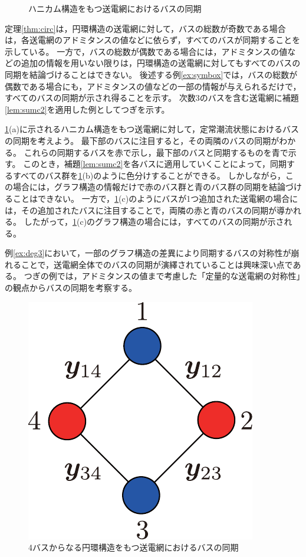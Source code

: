 \documentclass[tombow,dvipdfmx]{corona-a5}
\begin{document}
\begin{figure}[t]
{\begin{minipage}{0.3\linewidth}
    \subcaption{  }
  \end{minipage}
  \caption{ハニカム構造をもつ送電網におけるバスの同期}
  \label{fig:hony}
  }
\end{figure}

定理\ref{thm:circ}は，円環構造の送電網に対して，バスの総数が奇数である場合は，各送電網のアドミタンスの値などに依らず，すべてのバスが同期することを示している。
一方で，バスの総数が偶数である場合には，アドミタンスの値などの追加の情報を用いない限りは，円環構造の送電網に対してもすべてのバスの同期を結論づけることはできない。
後述する例\ref{ex:symbox}では，バスの総数が偶数である場合にも，アドミタンスの値などの一部の情報が与えられるだけで，すべてのバスの同期が示され得ることを示す。
次数3のバスを含む送電網に補題\ref{lem:sumc2}を適用した例としてつぎを示す。

\begin{例}[ハニカム構造の送電網におけるバスの同期]\label{ex:deg3}
\ref{fig:hony}(a)に示されるハニカム構造をもつ送電網に対して，定常潮流状態におけるバスの同期を考えよう。
最下部のバスに注目すると，その両隣のバスの同期がわかる。
これらの同期するバスを赤で示し，最下部のバスと同期するものを青で示す。
このとき，補題\ref{lem:sumc2}を各バスに適用していくことによって，同期するすべてのバス群を\ref{fig:hony}(b)のように色分けすることができる。
しかしながら，この場合には，グラフ構造の情報だけで赤のバス群と青のバス群の同期を結論づけることはできない。
一方で，\ref{fig:hony}(c)のようにバスが1つ追加された送電網の場合には，その追加されたバスに注目することで，両隣の赤と青のバスの同期が導かれる。
したがって，\ref{fig:hony}(c)のグラフ構造の場合には，すべてのバスの同期が示される。
\end{例}

例\ref{ex:deg3}において，一部のグラフ構造の差異により同期するバスの対称性が崩れることで，送電網全体でのバスの同期が演繹されていることは興味深い点である。
つぎの例では，アドミタンスの値まで考慮した「定量的な送電網の対称性」の観点からバスの同期を考察する。

\begin{figure}[t]
\centering
\includegraphics[width = .18\linewidth]{figs/4busbox}
\caption{4バスからなる円環構造をもつ送電網におけるバスの同期}
\label{fig:4busbox}
\end{figure}
\end{document}
